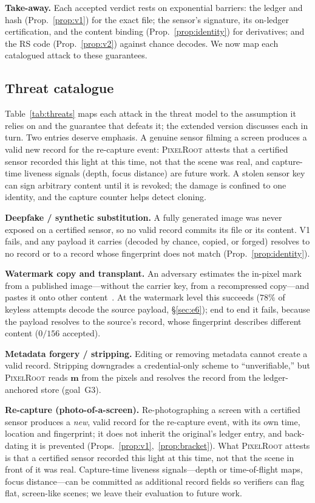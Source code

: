 \documentclass[journal]{IEEEtran}
\newcommand{\pr}{\textup{\textsc{PixelRoot}}}
\begin{document}
\noindent\textbf{Take-away.} Each accepted verdict rests on exponential
barriers: the ledger and hash (Prop.~\ref{prop:v1}) for the exact file; the
sensor's signature, its on-ledger certification, and the content binding
(Prop.~\ref{prop:identity}) for derivatives; and the RS code
(Prop.~\ref{prop:v2}) against chance decodes. We now map each catalogued attack
to these guarantees.

\subsection{Threat catalogue}
\ifshort
Table~\ref{tab:threats} maps each attack in the threat model to the assumption
it relies on and the guarantee that defeats it; the extended version discusses
each in turn. Two entries deserve emphasis. A genuine sensor filming a screen
produces a valid new record for the re-capture event: \pr{} attests that a
certified sensor recorded this light at this time, not that the scene was real,
and capture-time liveness signals (depth, focus distance) are future work. A
stolen sensor key can sign arbitrary content until it is revoked; the damage is
confined to one identity, and the capture counter helps detect cloning.

\else
\textbf{Deepfake / synthetic substitution.} A fully generated image was never
exposed on a certified sensor, so no valid record commits its file or its
content. V1 fails, and any payload it carries (decoded by chance, copied, or
forged) resolves to no record or to a record whose fingerprint does not match
(Prop.~\ref{prop:identity}).

\textbf{Watermark copy and transplant.} An adversary estimates the in-pixel mark
from a published image---without the carrier key, from a recompressed copy---and
pastes it onto other content~\cite{kutter2000copy}. At the watermark level this
succeeds ($78\%$ of keyless attempts decode the source payload, \S\ref{sec:e6});
end to end it fails, because the payload resolves to the source's record, whose
fingerprint describes different content ($0/156$ accepted).

\textbf{Metadata forgery / stripping.} Editing or removing metadata cannot create
a valid record. Stripping downgrades a credential-only scheme to
``unverifiable,'' but \pr{} reads $\mathbf{m}$ from the pixels and resolves the
record from the ledger-anchored store (goal~G3).

\textbf{Re-capture (photo-of-a-screen).} Re-photographing a screen with a certified
sensor produces a \emph{new}, valid record for the re-capture event, with its
own time, location and fingerprint; it does not inherit the original's ledger
entry, and back-dating it is prevented (Props.~\ref{prop:v1},~\ref{prop:bracket}).
What \pr{} attests is that a certified sensor recorded this light at this time,
not that the scene in front of it was real. Capture-time liveness signals---depth
or time-of-flight maps, focus distance---can be committed as additional record
fields so verifiers can flag flat, screen-like scenes; we leave their evaluation
to future work.
\end{document}

